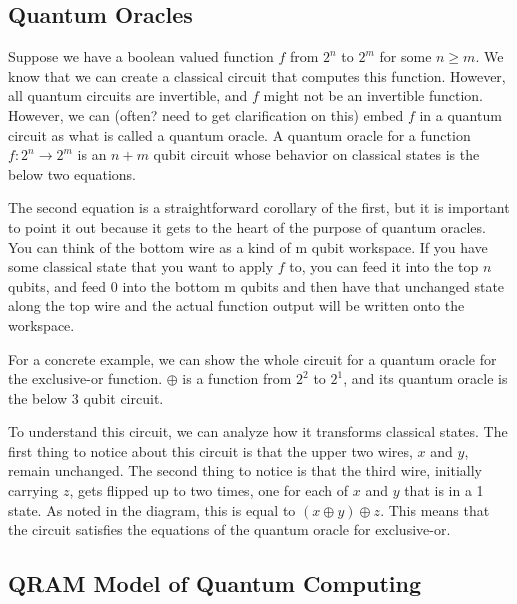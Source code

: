 \subsection{Quantum Oracles}

Suppose we have a boolean valued function $f$ from $2^n$ to $2^m$ for some $n \geq m$.
We know that we can create a classical circuit that computes this function.
However, all quantum circuits are invertible, and $f$ might not be an invertible function.
However, we can (often? need to get clarification on this) embed $f$ in a quantum circuit as what is called a quantum oracle.
A quantum oracle for a function $f: 2^n \rightarrow 2^m$ is an $n + m$ qubit circuit whose behavior on classical states is the below two equations.

The second equation is a straightforward corollary of the first, but it is important to point it out because it gets to the heart of the purpose of quantum oracles.
You can think of the bottom wire as a kind of m qubit workspace.
If you have some classical state that you want to apply $f$ to, you can feed it into the top $n$ qubits, and feed 0 into the bottom m qubits and then have that unchanged state along the top wire and the actual function output will be written onto the workspace.

For a concrete example, we can show the whole circuit for a quantum oracle for the exclusive-or function.
$\oplus$ is a function from $2^2$ to $2^1$, and its quantum oracle is the below $3$ qubit circuit.



To understand this circuit, we can analyze how it transforms classical states.
The first thing to notice about this circuit is that the upper two wires, $x$ and $y$, remain unchanged.
The second thing to notice is that the third wire, initially carrying $z$, gets flipped up to two times, one for each of $x$ and $y$ that is in a 1 state.
As noted in the diagram, this is equal to $(x \oplus y) \oplus z$.
This means that the circuit satisfies the equations of the quantum oracle for exclusive-or.
\subsection{QRAM Model of Quantum Computing}

